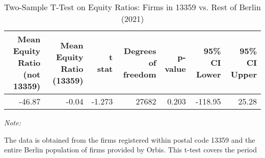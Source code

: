 \documentclass{article}
\begin{document}
\begin{landscape}
\begin{table}[!h]
\centering
\caption{\label{tab:unnamed-chunk-1}\label{tbl:ttest_summary} Two-Sample T-Test on Equity Ratios: Firms in 13359 vs. Rest of Berlin (2021)}
\centering
\begin{threeparttable}
\begin{tabular}[t]{rrrrrrr}
\toprule
Mean Equity Ratio (not 13359) & Mean Equity Ratio (13359) & t stat & Degrees of freedom & p-value & 95\% CI Lower & 95\% CI Upper\\
\midrule
-46.87 & -0.04 & -1.273 & 27682 & 0.203 & -118.95 & 25.28\\
\bottomrule
\end{tabular}
\begin{tablenotes}[para]
\item \textit{Note: } 
\item The data is obtained from the firms registered within postal code 13359 and the entire Berlin population of firms provided by Orbis. This t-test covers the period
\end{tablenotes}
\end{threeparttable}
\end{table}
\end{landscape}
\end{document}
